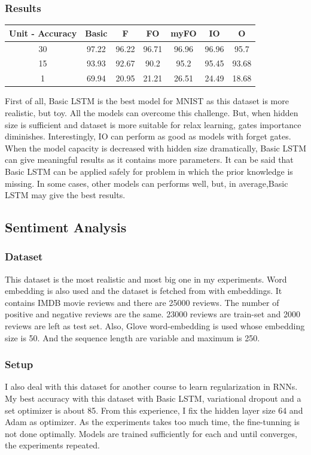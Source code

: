 \documentclass[12pt, letterpaper]{article}
\begin{document}
\subsubsection{Results}
\begin{center}
\begin{tabular}{ |c|c|c|c|c|c|c|  } 
 \hline
Unit - Accuracy   & Basic  &  F     &  FO     & myFO  & IO    &    O  \\ \hline 
30        & 97.22   &  96.22  &  96.71  & 96.96  & 96.96  & 95.7 \\ \hline
15       &    93.93 &   92.67 &    90.2   & 95.2   	& 95.45  &   93.68  \\ \hline
1  	 &     69.94    &    20.95     &     21.21   &  26.51        & 24.49      & 18.68\\
 \hline
\end{tabular}
\end{center}
	First of all, Basic LSTM is the best model for MNIST as this dataset is more realistic, but toy. All the models can overcome this challenge. But, when hidden size is sufficient and dataset is more suitable for relax learning, gates importance diminishes. Interestingly, IO can perform as good as models with forget gates. When the model capacity is decreased with hidden size dramatically, Basic LSTM can give meaningful results as it contains more parameters. It can be said that Basic LSTM can be applied safely for
problem in which the prior knowledge is missing. In some cases, other models can performs well, but, in average,Basic LSTM may give the best results. 
\subsection{Sentiment Analysis}
\subsubsection{Dataset}
	This dataset is the most realistic and most big one in my experiments. Word embedding is also used and the dataset is fetched from \cite{3} with embeddings. It contains IMDB movie reviews and there are 25000 reviews. The number of positive and negative reviews are the same. 23000 reviews are train-set and 2000 reviews are left as test set. Also, Glove word-embedding is used whose embedding size is 50. And the sequence length are variable and maximum is 250.
\subsubsection{Setup}
I also deal with this dataset for another course to learn regularization in RNNs. My best accuracy with this dataset with Basic LSTM, variational dropout \cite{4} and a set optimizer is about 85. From this experience, I fix the hidden layer size 64 and
Adam as optimizer. As the experiments takes too much time, the fine-tunning is not done optimally. Models are trained sufficiently for each and until converges, the experiments repeated.
\end{document}
